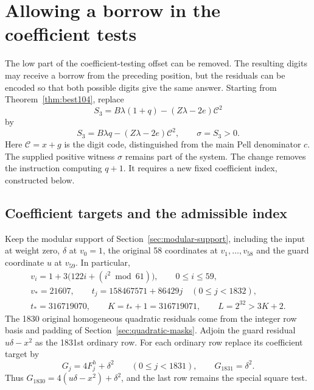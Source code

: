 \section{Allowing a borrow in the coefficient tests}\label{sec:borrow-mask}

The low part of the coefficient-testing offset can be removed. The
resulting digits may receive a borrow from the preceding position, but
the residuals can be encoded so that both possible digits give the same
answer. Starting from Theorem~\ref{thm:best104}, replace
\[
 S_3=B\lambda(1+q)-(Z\lambda-2e)\mathcal C^2
\]
by
\begin{equation}\label{eq:borrow-third-block}
 S_3=B\lambda q-(Z\lambda-2e)\mathcal C^2,
 \qquad \sigma=S_3>0.
\end{equation}
Here $\mathcal C=x+g$ is the digit code, distinguished from the main
Pell denominator $c$. The supplied positive witness $\sigma$ remains
part of the system. The change removes the instruction computing
$q+1$. It requires a new fixed coefficient index, constructed below.

\subsection{Coefficient targets and the admissible index}

Keep the modular support of Section~\ref{sec:modular-support}, including
the input at weight zero, $\delta$ at $v_0=1$, the original 58
coordinates at $v_1,\ldots,v_{58}$ and the guard coordinate $u$ at
$v_{59}$. In particular,
\[
\begin{gathered}
 v_i=1+3\bigl(122i+(i^2\bmod61)\bigr),\qquad 0\le i\le59,\\
 v_*=21607,\qquad t_j=158467571+86429j\quad(0\le j<1832),\\
 t_*=316719070,\qquad K=t_*+1=316719071,\qquad
 L=2^{32}>3K+2.
\end{gathered}
\]
The 1830 original homogeneous quadratic residuals come from the
integer row basis and padding of Section~\ref{sec:quadratic-masks}.
Adjoin the guard residual $u\delta-x^2$ as the 1831st ordinary row.
For each ordinary row replace its coefficient target by
\begin{equation}\label{eq:borrow-targets}
 G_j=4F_j^h+\delta^2\qquad(0\le j<1831),
 \qquad G_{1831}=\delta^2.
\end{equation}
Thus $G_{1830}=4(u\delta-x^2)+\delta^2$, and the last row remains
the special square test.

